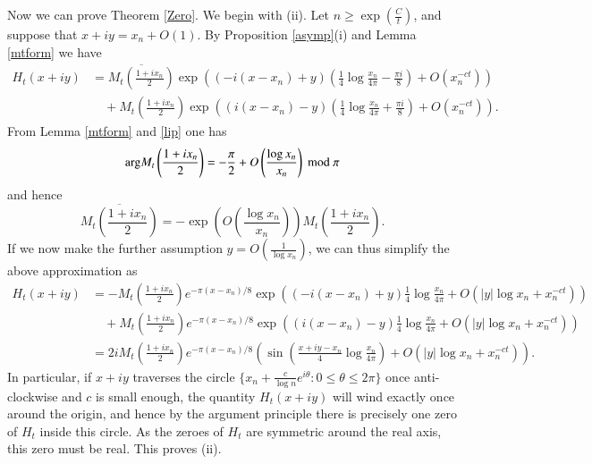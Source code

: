 Now we can prove Theorem \ref{Zero}.  We begin with (ii).  Let $n \geq \exp( \frac{C}{t})$, and suppose that $x+iy = x_n + O(1)$.  
By Proposition \ref{asymp}(i) and Lemma \ref{mtform} we have
\begin{equation}\label{htap}
\begin{split}
 H_t(x+iy) &= \overline{M_t\left(\frac{1+ix_n}{2}\right)} \exp\left( (-i(x-x_n)+y) \left(\frac{1}{4} \log \frac{x_n}{4\pi} - \frac{\pi i}{8}\right) + O( x_n^{-ct} )\right)\\
&\quad  + M_t\left(\frac{1+ix_n}{2}\right) \exp\left( (i(x-x_n)-y) \left(\frac{1}{4} \log \frac{x_n}{4\pi} + \frac{\pi i}{8}\right) + O( x_n^{-ct} )\right).
\end{split}
\end{equation}
From Lemma \ref{mtform} and \eqref{lip} one has
$$ \mathrm{arg} M_t\left(\frac{1+ix_n}{2}\right)  = -\frac{\pi}{2} + O\left( \frac{\log x_n}{x_n} \right)\hbox{ mod } \pi $$
and hence 
\begin{equation}\label{ma}
\overline{M_t\left(\frac{1+ix_n}{2}\right)} = - \exp\left( O( \frac{\log x_n}{x_n} ) \right) M_t\left(\frac{1+ix_n}{2}\right).
\end{equation}
If we now make the further assumption $y = O\left( \frac{1}{\log x_n}\right)$, we can thus simplify the above approximation as
\begin{equation}\label{ht-eff}
\begin{split}
 H_t(x+iy) &= - M_t\left(\frac{1+ix_n}{2}\right) e^{-\pi (x-x_n)/8} \exp\left( (-i(x-x_n)+y) \frac{1}{4} \log \frac{x_n}{4\pi} + O( |y| \log x_n + x_n^{-ct} ) \right)\\
&\quad + M_t\left(\frac{1+ix_n}{2}\right) e^{-\pi (x-x_n)/8} \exp\left( (i(x-x_n)-y) \frac{1}{4} \log \frac{x_n}{4\pi} + O( |y| \log x_n + x_n^{-ct} ) \right)\\
&= 2 i M_t\left(\frac{1+ix_n}{2}\right) e^{-\pi (x-x_n)/8} \left( \sin\left(\frac{x+iy-x_n}{4} \log \frac{x_n}{4\pi}\right) + O( |y| \log x_n + x_n^{-ct} )\right ).
\end{split}
\end{equation}
In particular, if $x+iy$ traverses the circle $\{ x_n + \frac{c}{\log n} e^{i\theta}: 0 \leq \theta \leq 2\pi\}$ once anti-clockwise and $c$ is small enough, the quantity $H_t(x+iy)$ will wind exactly once around the origin, and hence by the argument principle there is precisely one zero of $H_t$ inside this circle.  As the zeroes of $H_t$ are symmetric around the real axis, this zero must be real.  This proves (ii).

